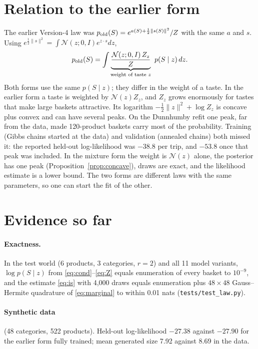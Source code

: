 \documentclass[11pt,a4paper]{article}
\theoremstyle{remark}
\newcommand{\N}{\mathcal N}
\begin{document}
\section{Relation to the earlier form}

The earlier Version-4 law was $p_{\rm old}(S)=e^{a(S)+\frac12\lVert s(S)\rVert^2}/Z$ with the same $a$ and $s$. Using
$e^{\frac12\lVert s\rVert^2}=\int\N(z;0,I)e^{z\cdot s}dz$,
\[
p_{\rm old}(S)=\int\underbrace{\frac{\N(z;0,I)\,Z_z}{Z}}_{\text{weight of taste }z}\ p(S\mid z)\,dz .
\]
Both forms use the same $p(S\mid z)$; they differ in the weight of a taste. In the earlier form a taste is
weighted by $\N(z)Z_z$, and $Z_z$ grows enormously for tastes that make large baskets attractive. Its logarithm
$-\frac12\lVert z\rVert^2+\log Z_z$ is concave plus convex and can have several peaks. On the Dunnhumby refit
one peak, far from the data, made 120-product baskets carry most of the probability. Training (Gibbs chains
started at the data) and validation (annealed chains) both missed it: the reported held-out log-likelihood was
$-38.8$ per trip, and $-53.8$ once that peak was included. In the mixture form the weight is $\N(z)$ alone, the
posterior has one peak (Proposition~\ref{prop:concave}), draws are exact, and the likelihood estimate is a lower bound. The two
forms are different laws with the same parameters, so one can start the fit of the other.

\section{Evidence so far}
\label{sec:evidence}

\paragraph{Exactness.} In the test world (6 products, 3 categories, $r=2$) and all 11 model variants,
$\log p(S\mid z)$ from \eqref{eq:cond}--\eqref{eq:Z} equals enumeration of every basket to $10^{-9}$, and the
estimate \eqref{eq:is} with 4{,}000 draws equals enumeration plus $48\times48$ Gauss--Hermite quadrature of
\eqref{eq:marginal} to within 0.01 nats (\texttt{tests/test\_law.py}).

\paragraph{Synthetic data} (48 categories, 522 products). Held-out log-likelihood $-27.38$ against $-27.90$ for the
earlier form fully trained; mean generated size 7.92 against 8.69 in the data.
\end{document}
